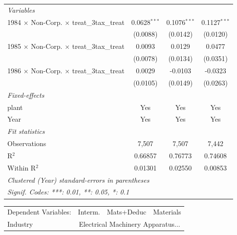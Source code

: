 \documentclass[
  12pt]{article}
\theoremstyle{definition}
\theoremstyle{remark}
\begin{document}
\begin{table}
\begin{minipage}{\linewidth}
\begin{tabular}{lccc}
   \midrule
   \emph{Variables}\\
   1984 $\times$ Non-Corp. $\times$ treat\_3tax\_treat     & 0.0628$^{***}$ & 0.1076$^{***}$ & 0.1127$^{***}$\\   
                                                           & (0.0088)       & (0.0142)       & (0.0120)\\   
   1985 $\times$ Non-Corp. $\times$ treat\_3tax\_treat     & 0.0093         & 0.0129         & 0.0477\\   
                                                           & (0.0078)       & (0.0134)       & (0.0351)\\   
   1986 $\times$ Non-Corp. $\times$ treat\_3tax\_treat     & 0.0029         & -0.0103        & -0.0323\\   
                                                           & (0.0105)       & (0.0149)       & (0.0263)\\   
   \midrule
   \emph{Fixed-effects}\\
   plant                                                   & Yes            & Yes            & Yes\\  
   Year                                                    & Yes            & Yes            & Yes\\  
   \midrule
   \emph{Fit statistics}\\
   Observations                                            & 7,507          & 7,507          & 7,442\\  
   R$^2$                                                   & 0.66857        & 0.76773        & 0.74608\\  
   Within R$^2$                                            & 0.01301        & 0.02550        & 0.00853\\  
   \midrule \midrule
   \multicolumn{4}{l}{\emph{Clustered (Year) standard-errors in parentheses}}\\
   \multicolumn{4}{l}{\emph{Signif. Codes: ***: 0.01, **: 0.05, *: 0.1}}\\
\end{tabular}
\par\endgroup
\begingroup
\centering
\begin{tabular}{lccc}
   \tabularnewline \midrule \midrule
   Dependent Variables:                                    & Interm.        & Mats+Deduc     & Materials\\  
   Industry & \multicolumn{3}{c}{Electrical Machinery Apparatus...} \\ 

\end{tabular}
\end{minipage}
\end{table}
\end{document}
